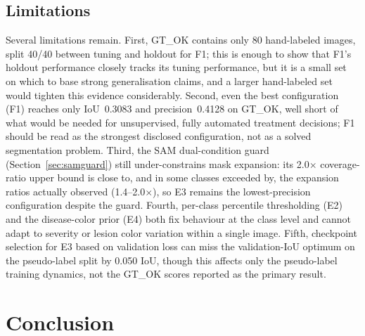 \documentclass[final,5p,times,twocolumn,authoryear]{elsarticle}
\begin{document}
\subsection{Limitations}
\label{sec:limitations}

Several limitations remain. First, GT\_OK contains only 80 hand-labeled images, split 40/40 between tuning and holdout for F1; this is enough to show that F1's holdout performance closely tracks its tuning performance, but it is a small set on which to base strong generalisation claims, and a larger hand-labeled set would tighten this evidence considerably. Second, even the best configuration (F1) reaches only IoU~0.3083 and precision~0.4128 on GT\_OK, well short of what would be needed for unsupervised, fully automated treatment decisions; F1 should be read as the strongest disclosed configuration, not as a solved segmentation problem. Third, the SAM dual-condition guard (Section~\ref{sec:samguard}) still under-constrains mask expansion: its 2.0$\times$ coverage-ratio upper bound is close to, and in some classes exceeded by, the expansion ratios actually observed (1.4--2.0$\times$), so E3 remains the lowest-precision configuration despite the guard. Fourth, per-class percentile thresholding (E2) and the disease-color prior (E4) both fix behaviour at the class level and cannot adapt to severity or lesion color variation within a single image. Fifth, checkpoint selection for E3 based on validation loss can miss the validation-IoU optimum on the pseudo-label split by 0.050 IoU, though this affects only the pseudo-label training dynamics, not the GT\_OK scores reported as the primary result.

\FloatBarrier
\section{Conclusion}
\label{sec:conclusion}
\end{document}
